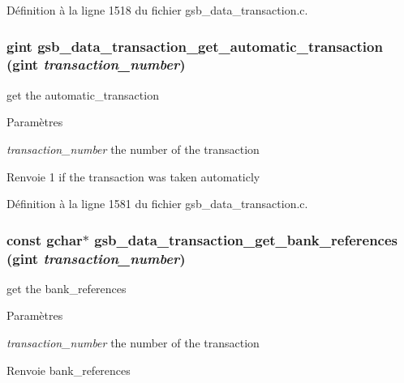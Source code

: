 Définition à la ligne 1518 du fichier gsb\_\-data\_\-transaction.c.

\subsubsection[{gsb\_\-data\_\-transaction\_\-get\_\-automatic\_\-transaction}]{\setlength{\rightskip}{0pt plus 5cm}gint gsb\_\-data\_\-transaction\_\-get\_\-automatic\_\-transaction (gint {\em transaction\_\-number})}\label{gsb__data__transaction_8c_a4cc433dd23e93537f8554d6e1532f794}
get the automatic\_\-transaction 
\begin{DoxyParams}{Paramètres}
\item[{\em transaction\_\-number}]the number of the transaction \end{DoxyParams}
\begin{DoxyReturn}{Renvoie}
1 if the transaction was taken automaticly 
\end{DoxyReturn}


Définition à la ligne 1581 du fichier gsb\_\-data\_\-transaction.c.

\subsubsection[{gsb\_\-data\_\-transaction\_\-get\_\-bank\_\-references}]{\setlength{\rightskip}{0pt plus 5cm}const gchar$\ast$ gsb\_\-data\_\-transaction\_\-get\_\-bank\_\-references (gint {\em transaction\_\-number})}\label{gsb__data__transaction_8c_a8ef7712f47278152551c3d9454ecf36a}
get the bank\_\-references


\begin{DoxyParams}{Paramètres}
\item[{\em transaction\_\-number}]the number of the transaction\end{DoxyParams}
\begin{DoxyReturn}{Renvoie}
bank\_\-references 
\end{DoxyReturn}


